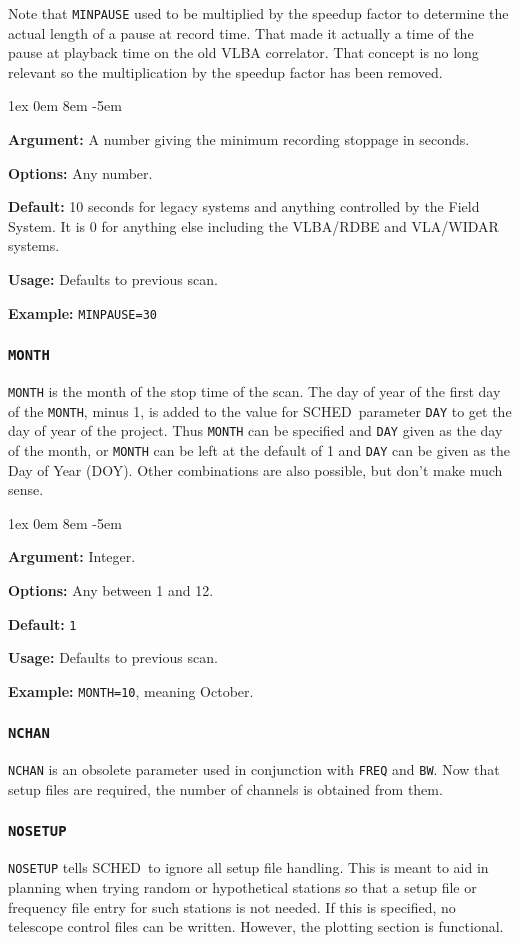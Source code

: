 \documentclass{report}
\newcommand{\schedb}{{\sc SCHED~}}
\newcommand{\rcwbox}[5]{
  \begin{list}{}{\parsep 1ex  \itemsep 0em
                 \leftmargin 8em  \itemindent -5em }
    \item {\bf Argument:} #1
    \item {\bf Options:}  #2
    \item {\bf Default:}  #3
    \item {\bf Usage:}    #4
    \item {\bf Example:}  #5
  \end{list}
}
\begin{document}
Note that {\tt MINPAUSE} used to be multiplied by the speedup factor
to determine the actual length of a pause at record time.  That made
it actually a time of the pause at playback time on the old VLBA
correlator.  That concept is no long relevant so the multiplication
by the speedup factor has been removed.

\rcwbox
{A number giving the minimum recording stoppage in seconds.}
{Any number.}
{10 seconds for legacy systems and anything controlled by the
Field System. It is 0 for anything else including the VLBA/RDBE 
and VLA/WIDAR systems.}
{Defaults to previous scan.}
{{\tt MINPAUSE=30}}



\subsubsection{\label{MP:MONTH}{\tt MONTH}}

{\tt MONTH} is the month of the stop time of the scan.  The day of
year of the first day of the {\tt MONTH}, minus 1, is added to the
value for \schedb parameter {\tt DAY} to get the day of year of
the project.  Thus {\tt MONTH} can be specified and {\tt DAY} given
as the day of the month, or {\tt MONTH} can be left at the default
of 1 and {\tt DAY} can be given as the Day of Year (DOY).  Other
combinations are also possible, but don't make much sense.

\rcwbox
{Integer.}
{Any between 1 and 12.}
{{\tt 1}}
{Defaults to previous scan.}
{{\tt MONTH=10}, meaning October.}


\subsubsection{\label{MP:NCHAN}{\tt NCHAN}}

{\tt NCHAN} is an obsolete parameter used in conjunction with {\tt FREQ} and
{\tt BW}.  Now that setup files are required, the number of channels is
obtained from them.

\subsubsection{\label{MP:NOSETUP}{\tt NOSETUP}}

{\tt NOSETUP} tells \schedb to ignore all setup file handling.  This
is meant to aid in planning when trying random or hypothetical
stations so that a setup file or frequency file entry for such
stations is not needed.  If this is specified, no telescope control
files can be written.  However, the plotting section is functional.
\end{document}
